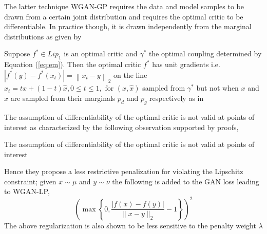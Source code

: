 The latter technique WGAN-GP requires the data and model samples to be drawn from a certain joint distribution and requires the optimal critic to be differentiable. In practice though, it is drawn independently from the marginal distributions as given by 
\begin{observe}
Suppose $f^* \in Lip_1$ is an optimal critic and $\gamma^*$ the optimal coupling determined by Equation (\ref{eq:em}). Then the optimal critic $f^* $ has unit gradients i.e. $\left|f^{*}(y)-f^{*}\left(x_{t}\right)\right|=\left\|x_{t}-y\right\|_{2}$ on the line $x_{t}=t x+(1-t) \hat{x}, 0 \leq t \leq 1, \text { for }(x, \hat{x})$ sampled from $\gamma^*$ but not when $x$ and $\hat{x}$ are sampled from their marginals $p_d$ and $p_g$ respectively as in \citep{gularajani}
\end{observe}{}
The assumption of differentiability of the optimal critic is not valid at points of interest as characterized by the following observation supported by proofs,
\begin{observe}
The assumption of differentiability of the optimal critic is not valid at points of interest
\end{observe}{}
Hence they propose a less restrictive penalization for violating the Lipschitz constraint; given $x\sim\mu$ and $y \sim \nu$
the following is added to the GAN loss leading to WGAN-LP,
$$
\left(\max \left\{0, \frac{|f(x)-f(y)|}{\|x-y\|_{2}}-1\right\}\right)^{2}
$$
The above regularization is also shown to be less sensitive to the penalty weight $\lambda$
